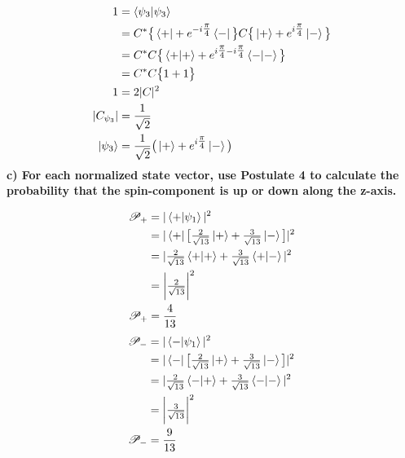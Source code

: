 \documentclass[paper=a4, fontsize=11pt]{scrartcl} %
\numberwithin{equation}{section} %
\numberwithin{figure}{section} %
\numberwithin{table}{section} %
\begin{document}
\begin{align*}
1 & = \braket{\psi_3 | \psi_3} \\
  & = C^* \big \{  \bra{+} + e^{-i\tfrac{\pi}{4}} \bra{-} \big \} C \big \{ \ket{+} + e^{i\tfrac{\pi}{4}} \ket{-} \big \} \\
  & = C^*C \big \{ \braket{+|+} + e^{i\tfrac{\pi}{4} - i\tfrac{\pi}{4}} \braket{-|-} \big \} \\
  & = C^* C \big \{ 1+ 1 \big \} \\
  1 & = 2|C|^2 \\
  |C_{\psi_3}| & = \frac{1}{\sqrt{2}} \\
  \ket{\psi_3} & = \frac{1}{\sqrt{2}} \big ( \ket{+} +   e^{i\tfrac{\pi}{4}} \ket{- }\big )
\end{align*}
 \textbf{c) For each normalized state vector, use Postulate 4 to calculate the probability that the spin-component is up or down along the z-axis. }
 \begin{multicols}{2}
 \noindent
\begin{align*}
 \mathscr{P_+} & = |\braket{+|\psi_1 }|^2 \\
 & = |\bra{+} \big[ \tfrac{2}{\sqrt{13}}\ket{+} + \tfrac{3}{\sqrt{13}} \ket{-} \big] |^2 \\
 & = |\tfrac{2}{\sqrt{13}} \braket{+|+} + \tfrac{3}{\sqrt{13}} \braket{+|-}|^2 \\
 & = \bigg | \tfrac{2}{\sqrt{13}} \bigg |^2 \\
\mathscr{P_+} & = \frac{4}{13}
  \end{align*}
   \begin{align*}
 \mathscr{P_-} & = |\braket{-|\psi_1 }|^2 \\
 & = |\bra{-} \big[ \tfrac{2}{\sqrt{13}}\ket{+} + \tfrac{3}{\sqrt{13}} \ket{-} \big] |^2 \\
 & = |\tfrac{2}{\sqrt{13}} \braket{-|+} + \tfrac{3}{\sqrt{13}} \braket{-|-}|^2 \\
 & = \bigg | \tfrac{3}{\sqrt{13}} \bigg |^2 \\
\mathscr{P_-} & = \frac{9}{13}
  \end{align*}
  \end{multicols}
\end{document}
